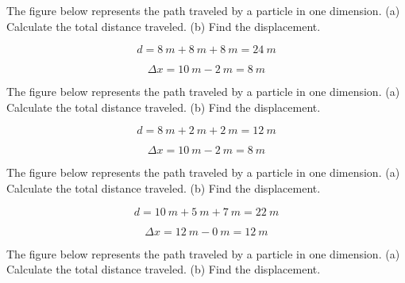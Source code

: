 \documentclass[]{exam}
\begin{document}
\begin{questions}

\question \label{RpoqN}
The figure below represents the path traveled by a particle in one dimension. (a) Calculate the total distance traveled. (b) Find the displacement.


\begin{solution}
\begin{equation*}
    d = \SI{8}{m} + \SI{8}{m} + \SI{8}{m} = \boxed{\SI{24}{m}}
\end{equation*}

\begin{equation*}
    \Delta x = \SI{10}{m} - \SI{2}{m} = \boxed{\SI{8}{m}}
\end{equation*}
\end{solution}

\question
The figure below represents the path traveled by a particle in one dimension. (a) Calculate the total distance traveled. (b) Find the displacement.


\begin{solution}
\begin{equation*}
    d = \SI{8}{m} + \SI{2}{m} + \SI{2}{m} = \boxed{\SI{12}{m}}
\end{equation*}

\begin{equation*}
    \Delta x = \SI{10}{m} - \SI{2}{m} = \boxed{\SI{8}{m}}
\end{equation*}
\end{solution}


\question
The figure below represents the path traveled by a particle in one dimension. (a) Calculate the total distance traveled. (b) Find the displacement.


\begin{solution}
\begin{equation*}
    d = \SI{10}{m} + \SI{5}{m} + \SI{7}{m} = \boxed{\SI{22}{m}}
\end{equation*}

\begin{equation*}
    \Delta x = \SI{12}{m} - \SI{0}{m} = \boxed{\SI{12}{m}}
\end{equation*}
\end{solution}

\question
The figure below represents the path traveled by a particle in one dimension. (a) Calculate the total distance traveled. (b) Find the displacement.


\end{questions}
\end{document}
